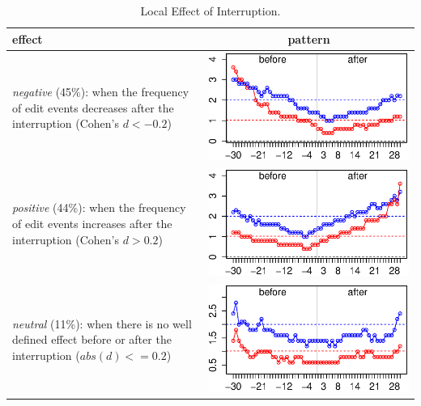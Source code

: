 \documentclass[times]{smrauth}
\begin{document}
\begin{table}[ht!]
\caption{Local Effect of Interruption. }
\label{tbl:local_effect}
\centering
\begin{tabular}{p{4cm} | c}
effect & pattern \\
\hline
\textit{negative} (45\%): when the frequency of edit events decreases after the interruption (Cohen's $d < -0.2$)
	& \includegraphics[valign=m,scale=0.3]{figures/neg_ints} \\
\textit{positive} (44\%): when the frequency of edit events increases after the interruption (Cohen's $d > 0.2$)
	& \includegraphics[valign=m,scale=0.3]{figures/pos_ints} \\
\textit{neutral} (11\%): when there is no well defined effect before or after the interruption ($abs(d) <= 0.2$)
	& \includegraphics[valign=m,scale=0.3]{figures/neu_ints} 
\end{tabular}
\end{table}
\end{document}
